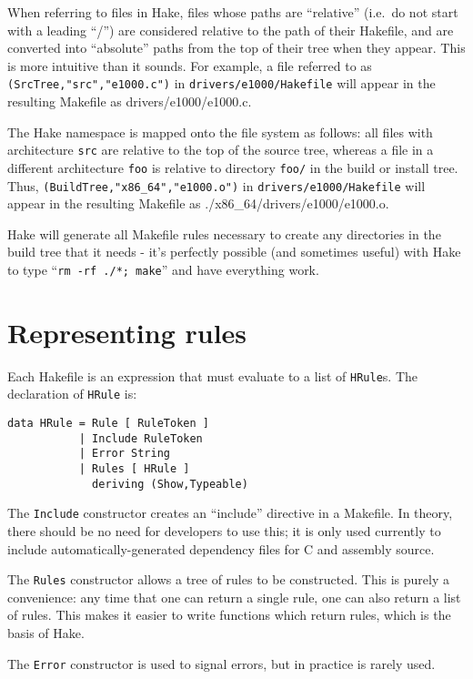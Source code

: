 \documentclass[a4paper,twoside]{report} %
\begin{document}
When referring to files in Hake, files whose paths are ``relative''
(i.e.\ do not start with a leading ``/'') are considered relative to
the path of their Hakefile, and are converted into
``absolute'' paths from the top of their tree when they appear.
This is more intuitive than it sounds.  For example, a file referred
to as \texttt{(SrcTree,"src","e1000.c")} in
\texttt{drivers/e1000/Hakefile} will appear in the resulting Makefile
as {drivers/e1000/e1000.c}.  

The Hake namespace is mapped onto the file system as follows: all
files with architecture \texttt{src} are relative to the top of the
source tree, whereas a file in a different architecture \texttt{foo}
is relative to directory \texttt{foo/} in the build or install tree.
Thus, \texttt{(BuildTree,"x86\_64","e1000.o")} in
\texttt{drivers/e1000/Hakefile} will  appear in the resulting Makefile
as {./x86\_64/drivers/e1000/e1000.o}. 

Hake will generate all Makefile rules necessary to create any
directories in the build tree that it needs - it's perfectly possible
(and sometimes useful) with Hake to type ``\texttt{rm -rf ./*;
  make}'' and have everything work.  

\section{Representing rules}\label{sec:reprules}

Each Hakefile is an expression that must evaluate to a list of
\texttt{HRule}s.  The declaration of \texttt{HRule} is:
\begin{verbatim}
data HRule = Rule [ RuleToken ]
           | Include RuleToken
           | Error String
           | Rules [ HRule ]
             deriving (Show,Typeable)
\end{verbatim}

The \texttt{Include} constructor creates an ``include'' directive in a
Makefile.  In theory, there should be no need for developers to use
this; it is only used currently to include automatically-generated
dependency files for C and assembly source. 

The \texttt{Rules} constructor allows a tree of rules to be
constructed.  This is purely a convenience: any time that one can
return a single rule, one can also return a list of rules.  This makes
it easier to write functions which return rules, which is the basis of
Hake.

The \texttt{Error} constructor is used to signal errors, but in
practice is rarely used. 
\end{document}
